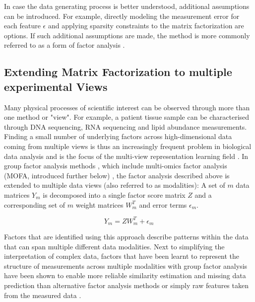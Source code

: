 \begin{flushleft}
In case the data generating process is better understood, additional assumptions can be introduced. For example, directly modeling the measurement error for each feature \(\epsilon\) and applying sparsity constraints to the matrix factorization are options. If such additional assumptions are made, the method is more commonly referred to as a form of factor analysis \parencite{klamiGroupFactorAnalysis2014}.


\subsection{Extending Matrix Factorization to multiple experimental Views}

Many physical processes of scientific interest can be observed through more than one method or "view". For example, a patient tissue sample can be characterised through DNA sequencing, RNA sequencing and lipid abundance measurements. Finding a small number of underlying factors across high-dimensional data coming from multiple views is thus an increasingly frequent problem in biological data analysis and is the focus of the multi-view representation learning field \parencite{liSurveyMultiViewRepresentation2019}. In group factor analysis methods \parencite{virtanenBayesianGroupFactor2012, klamiGroupFactorAnalysis2014}, which include multi-omics factor analysis (MOFA, introduced further below) \parencite{argelaguetMultiOmicsFactorAnalysis2018b, argelaguetMOFAStatisticalFramework2020a}, the factor analysis described above is extended to multiple data views (also referred to as modalities): A set of \(m\) data matrices \( Y_m \) is decomposed into a single factor score matrix \( Z \) and a corresponding set of \(m\) weight matrices \( W_m^T \) and error terms \(\epsilon_m\). 

\begin{equation}
    Y_m = ZW_m^T + \epsilon_m
\end{equation}

Factors that are identified using this approach describe patterns within the data that can span multiple different data modalities. Next to simplifying the interpretation of complex data, factors that have been learnt to represent the structure of measurements across multiple modalities with group factor analysis have been shown to enable more reliable similarity estimation and missing data prediction than alternative factor analysis methods or simply raw features taken from the measured data \parencite{klamiGroupFactorAnalysis2014}.
\par


\end{flushleft}
